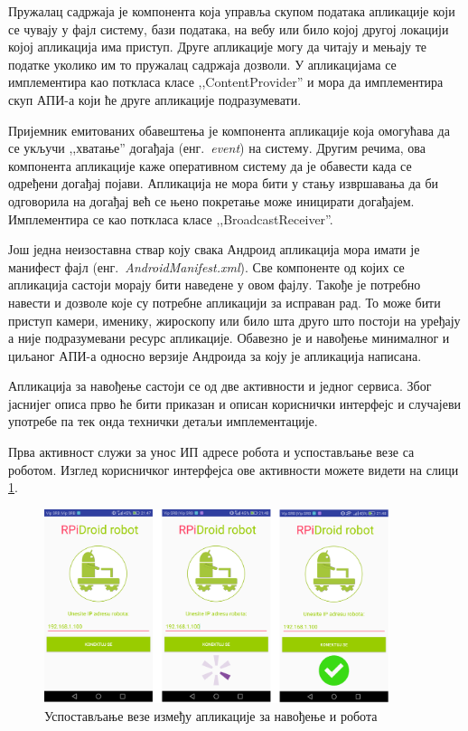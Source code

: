 \documentclass[12pt,oneside]{memoir}
\theoremstyle{remark}
\begin{document}
Пружалац садржаја је компонента која управља скупом података апликације који се чувају у фајл систему, бази података, на вебу или било којој другој локацији којој апликација има приступ. Друге апликације могу да читају и мењају те податке уколико им то пружалац садржаја дозволи. У апликацијама се имплементира као поткласа класе ,,ContentProvider'' и мора да имплементира скуп АПИ-а који ће друге апликације подразумевати.

Пријемник емитованих обавештења је компонента апликације која омогућава да се укључи ,,хватање'' догађаја (енг.~{\em event}) на систему. Другим речима, ова компонента апликације каже оперативном систему да је обавести када се одређени догађај појави. Апликација не мора бити у стању извршавања да би одговорила на догађај већ се њено покретање може иницирати догађајем. Имплементира се као поткласа класе ,,BroadcastReceiver''.

Још једна неизоставна ствар коју свака Андроид апликација мора имати је манифест фајл  (енг.~{\em AndroidManifest.xml}). Све компоненте од којих се апликација састоји морају бити наведене у овом фајлу. Такође је потребно навести и дозволе које су потребне апликацији за исправан рад. То може бити приступ камери, именику, жироскопу или било шта друго што постоји на уређају а није подразумевани ресурс апликације. Обавезно је и навођење минималног и циљаног АПИ-а односно верзије Андроида за коју је апликација написана. 

Апликација за навођење састоји се од две активности и једног сервиса. Због јаснијег описа прво ће бити приказан и описан кориснички интерфејс и случајеви употребе па тек онда технички детаљи имплементације. 

Прва активност служи за унос ИП адресе робота и успостављање везе са роботом. Изглед корисничког интерфејса ове активности можете видети на слици \ref{fig:activity1}.

\begin{figure}[!ht]
\centering
\includegraphics[width=0.9\textwidth]{slike/povezivanje.png}
\caption{Успостављање везе између апликације за навођење и робота}
\label{fig:activity1}
\end{figure}
\end{document}

